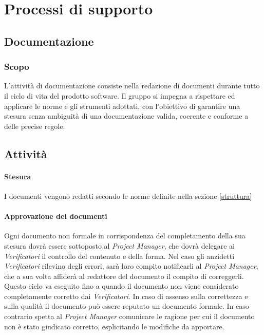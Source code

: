 \section{Processi di supporto}


\subsection{Documentazione}
\label{sec:documentazione}
\subsubsection{Scopo}
L'attività di documentazione consiste nella redazione di documenti durante tutto il ciclo di vita del prodotto software. Il gruppo si impegna a rispettare ed applicare le norme e gli strumenti adottati, con l'obiettivo di garantire una stesura senza ambiguità di una documentazione valida, coerente e conforme a delle precise regole. 

\subsection{Attività}

\paragraph{Stesura} \Spazio 
I documenti vengono redatti secondo le norme definite nella sezione \ref{struttura} 

\paragraph{Approvazione dei documenti} \Spazio
Ogni documento non formale in corrispondenza del completamento della sua stesura dovrà essere sottoposto al \textit{Project Manager}, che dovrà delegare ai \textit{Verificatori} il controllo del contenuto e della forma. Nel caso gli anzidetti \textit{Verificatori} rilevino degli errori, sarà loro compito notificarli al \textit{Project Manager}, che a sua volta affiderà al redattore del documento il compito di correggerli. Questo ciclo va eseguito fino a quando il documento non viene considerato completamente corretto dai  \textit{Verificatori}. In caso di assenso sulla correttezza e sulla qualità il documento può essere reputato un documento formale. In caso contrario spetta al \textit{Project Manager} comunicare le ragione per cui il documento non è stato giudicato corretto, esplicitando le modifiche da apportare.

